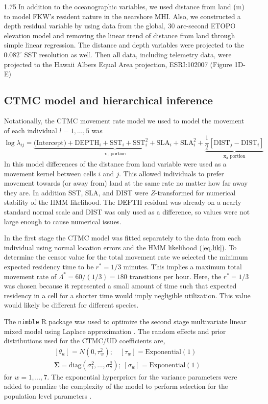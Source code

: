 \documentclass[12pt]{article}
\newcommand{\bx}{\ensuremath{\mathbf{x}}}
\newcommand{\bSig}{\ensuremath{\boldsymbol{\Sigma}}}
\begin{document}
\begin{spacing}{1.75}
In addition to the oceanographic variables, we used distance from land (m) to model FKW's resident nature in the nearshore MHI. Also, we constructed a depth residual variable by using data from the global, 30 arc-second ETOPO elevation model \citep{etopo2022a} and removing the linear trend of distance from land through simple linear regression. The distance and depth variables were projected to the $0.082^\circ$ SST resolution as well. Then all data, including telemetry data, were projected to the Hawaii Albers Equal Area projection, ESRI:102007 (Figure 1D-E) 

\subsection{CTMC model and hierarchical inference \label{sec.fkw.model}}

Notationally, the CTMC movement rate model we used to model the movement of each individual $l=1,\dots,5$ was
\[
\log \lambda_{ij} = \underbrace{\text{(Intercept)} +\text{DEPTH}_i + \text{SST}_i + \text{SST}^2_i + \text{SLA}_i + \text{SLA}^2_i}_{\bx_1 \text{ portion}} + 
\underbrace{\frac{1}{2}[\text{DIST}_j - \text{DIST}_i]}_{\bx_3 \text{ portion}}
\]
In this model differences of the distance from land variable were used as a movement kernel between cells $i$ and $j$. This allowed individuals to prefer movement towards (or away from) land at the same rate no matter how far away they are. In addition SST, SLA, and DIST were $Z$-transformed for numerical stability of the HMM likelihood. The DEPTH residual was already on a nearly standard normal scale and DIST was only used as a difference, so values were not large enough to cause numerical issues. 

In the first stage the CTMC model was fitted separately to the data from each individual using normal location errors and the HMM likelihood (\ref{eq.lik}). To determine the censor value for the total movement rate we selected the minimum expected residency time to be $r^* = 1/3$ minutes. This implies a maximum total movement rate of $\Lambda^* = 60/(1/3) = 180$ transitions per hour. Here, the $r^* = 1/3$ was chosen because it represented a small amount of time such that expected residency in a cell for a shorter time would imply negligible utilization. This value would likely be different for different species.  

 The  {\tt nimble} R package \citep{Valpine:2017vg} was used to optimize the second stage multivariate linear mixed model using Laplace approximation \citep{Valpine:2017vg}. The random effects and prior distributions used for the CTMC/UD coefficients are,
\[
\begin{array}{c}
{}[\theta_w] = N(0, \tau_w^2);\quad [\tau_w] = \text{Exponential}(1) \\
{}\bSig = \text{diag}(\sigma^2_1,\dots, \sigma^2_7);~ [\sigma_w] = \text{Exponential}(1)
\end{array}
\]
for $w=1,\dots,7$. The exponential hyperpriors for the variance parameters were added to penalize the complexity of the model to perform selection for the population level parameters \citep{hooten2015guide,martins2017penalising}. 



\end{spacing}
\end{document}
